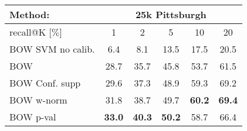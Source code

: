 
	\begin{tabularx}{0.915\linewidth}{|l|c c c c c|}
		\hline 
		\rowcolor{maroon!50}
		Method: & \multicolumn{5}{c|}{25k Pittsburgh} \\
		\hline 
		\hline 
		\rowcolor{maroon!50}
		recall@K [$\%$] & 1 & 2 & 5 & 10 & 20 \\
		\hline
		\rowcolor{maroon!10}
      \rowcolor{maroon!10}
    BOW SVM no calib.   & 6.4   & 8.1   & 13.5  & 17.5  & 20.5 \\
		  \rowcolor{maroon!10}
    BOW           & 28.7  & 35.7  & 45.8 & 53.7   & 61.5 \\
      \rowcolor{maroon!10}
    
    \textcolor{petr}{BOW  Conf. supp~\cite{Knopp2010}}  & \textcolor{petr}{29.6}  
                                    & \textcolor{petr}{37.3}  
                                    & \textcolor{petr}{48.9} 
                                    & \textcolor{petr}{59.3}   
                                    & \textcolor{petr}{69.2}  \\
      \rowcolor{maroon!10}
		BOW w-norm                      & 31.8    
                                    & 38.7  
                                    & 49.7  
                                    & \textbf{60.2}  
                                    & \textbf{69.4} \\
      \rowcolor{maroon!10}
    BOW p-val                       & \textbf{33.0}  
                                    & \textbf{40.3}  
                                    & \textbf{50.2} 
                                    & 58.7   
                                    & 66.4 \\
    \hline

\end{tabularx}
